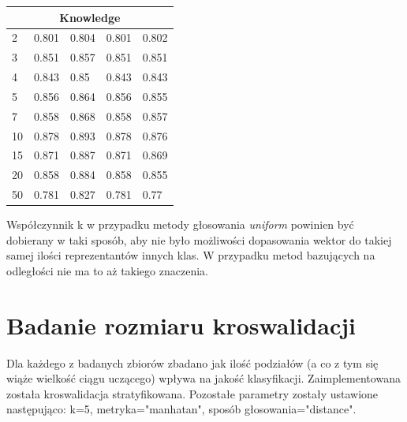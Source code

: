 \documentclass[12pt,a4paper]{article}
\begin{document}
\begin{tabular}{ |p{2.5cm}||p{2.5cm}|p{2.5cm}|p{2.5cm}|p{2.5cm}| }
\hline
\multicolumn{5}{|c|}{Knowledge}\\
\hline
2 & 0.801 & 0.804 & 0.801 & 0.802\\
3 & 0.851 & 0.857 & 0.851 & 0.851\\
4 & 0.843 & 0.85 & 0.843 & 0.843\\
5 & 0.856 & 0.864 & 0.856 & 0.855\\
7 & 0.858 & 0.868 & 0.858 & 0.857\\
10 & 0.878 & 0.893 & 0.878 & 0.876\\
15 & 0.871 & 0.887 & 0.871 & 0.869\\
20 & 0.858 & 0.884 & 0.858 & 0.855\\
50 & 0.781 & 0.827 & 0.781 & 0.77\\
\hline
\end{tabular}
\vspace{5cm}

Współczynnik k w przypadku metody głosowania \textit{uniform} powinien być dobierany w taki sposób, aby nie było możliwości dopasowania wektor do takiej samej ilości reprezentantów innych klas. W przypadku metod bazujących na odległości nie ma to aż takiego znaczenia.

\section{Badanie rozmiaru kroswalidacji}
Dla każdego z badanych zbiorów zbadano jak ilość podziałów (a co z tym się wiąże wielkość ciągu uczącego) wpływa na jakość klasyfikacji. Zaimplementowana została kroswalidacja stratyfikowana. Pozostałe parametry zostały ustawione następująco: k=5, metryka="manhatan", sposób głosowania="distance".
\end{document}

